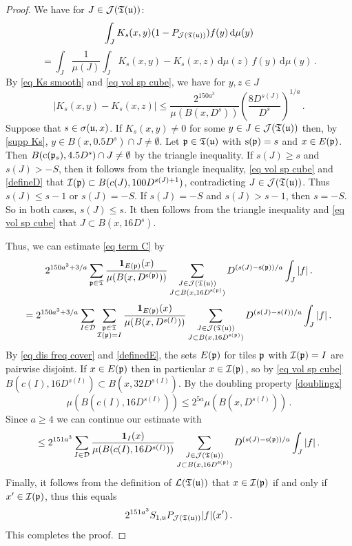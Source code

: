 {\begin{proof}
    We have for $J \in \mathcal{J}(\mathfrak T(\mathfrak u))$:
    $$
        \int_J K_{s}(x,y)(1 - P_{\mathcal{J}(\mathfrak T(\mathfrak u))})f(y) \, \mathrm{d}\mu(y)
    $$
    \begin{equation}
    \label{eq canc comp}
        =  \int_J \frac{1}{\mu(J)} \int_J K_s(x,y) - K_s(x,z) \, \mathrm{d}\mu(z) \,f(y) \, \mathrm{d}\mu(y)\,.
    \end{equation}
    By \eqref{eq Ks smooth} and \eqref{eq vol sp cube}, we have for $y, z \in J$
    $$
        |K_s(x,y) - K_s(x,z)| \le \frac{2^{150a^3}}{\mu(B(x, D^s))} \left(\frac{8 D^{s(J)}}{D^s}\right)^{1/a}\,.
    $$
    Suppose that $s \in \sigma(\mathfrak u, x)$.
    If $K_s(x,y) \ne 0$ for some $y \in J \in \mathcal{J}(\mathfrak T(\mathfrak u))$ then, by \eqref{supp Ks}, $y \in B(x, 0.5 D^s) \cap J \ne \emptyset$. Let $\mathfrak p \in \mathfrak T(\mathfrak u)$ with $\mathrm{s}(\mathfrak p) = s$ and $x \in E(\mathfrak p)$. Then $B(\mathrm{c}(\mathfrak p_s), 4.5D^s) \cap J \ne \emptyset$ by the triangle inequality. If $s(J) \ge s$ and $s(J) > -S$, then it follows from the triangle inequality, \eqref{eq vol sp cube} and \eqref{defineD} that $\mathcal{I}(\mathfrak p) \subset B(c(J), 100 D^{s(J)+1})$, contradicting $J \in \mathcal{J}(\mathfrak{T}(\mathfrak u))$. Thus $s(J) \le s - 1$ or $s(J) = -S$. If $s(J) = -S$ and $s(J) > s - 1$, then $s = -S$. So in both cases, $s(J) \le s$. It then follows from the triangle inequality and \eqref{eq vol sp cube} that $J \subset B(x, 16 D^s)$.

    Thus, we can estimate \eqref{eq term C} by
    $$
        2^{150a^3 + 3/a}\sum_{\mathfrak p\in \mathfrak{T}}\frac{\mathbf{1}_{E(\mathfrak p)}(x)}{\mu(B(x,D^{\mathrm{s}(\mathfrak p)}))}\sum_{\substack{J\in \mathcal{J}(\mathfrak T(\mathfrak u))\\J\subset B(x,  16D^{\mathrm{s}(\mathfrak p)})}}  D^{(s(J) - \mathrm{s}(\mathfrak p))/a} \int_J |f|\,.
    $$
    $$
        = 2^{150a^3 + 3/a}\sum_{I \in \mathcal{D}} \sum_{\substack{\mathfrak p\in \mathfrak{T}\\ \mathcal{I}(\mathfrak p) = I}}\frac{\mathbf{1}_{E(\mathfrak p)}(x)}{\mu(B(x, D^{s(I)}))}\sum_{\substack{J\in \mathcal{J}(\mathfrak T(\mathfrak u))\\J\subset B(x,  16 D^{\mathrm{s}(\mathfrak p)})}}  D^{(s(J) - s(I))/a} \int_J |f|\,.
    $$
    By \eqref{eq dis freq cover} and \eqref{definedE}, the sets $E(\mathfrak p)$ for tiles $\mathfrak p$ with $\mathcal{I}(\mathfrak p) = I$ are pairwise disjoint.
    If $x \in E(\mathfrak p)$ then in particular $x \in \mathcal{I}(\mathfrak p)$, so by \eqref{eq vol sp cube} $B(c(I),16D^{s(I)}) \subset B(x, 32D^{s(I)})$. By the doubling property \eqref{doublingx}
    $$
        \mu(B(c(I), 16D^{s(I)})) \le 2^{5a} \mu(B(x, D^{s(I)}))\,.
    $$
    Since $a \ge 4$ we can continue our estimate with
    $$
        \le 2^{151a^3}\sum_{I \in \mathcal{D}} \frac{\mathbf{1}_{I}(x)}{\mu(B(c(I),  16D^{s(I)}))}\sum_{\substack{J\in \mathcal{J}(\mathfrak T(\mathfrak u))\\J\subset B(x,  16 D^{\mathrm{s}(\mathfrak p)})}}  D^{(s(J) - \mathrm{s}(\mathfrak p))/a} \int_J |f|\,.
    $$
    Finally, it follows from the definition of $\mathcal{L}(\mathfrak T(\mathfrak u))$ that $x \in \mathcal{I}(\mathfrak p)$ if and only if $x' \in \mathcal{I}(\mathfrak p)$, thus this equals
    $$
         2^{151a^3} S_{1,\mathfrak u} P_{\mathcal{J}(\mathfrak T(\mathfrak u))}|f|(x')\,.
    $$
    This completes the proof.
\end{proof}

}
